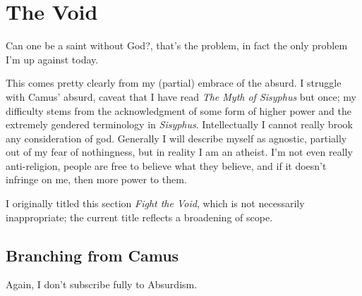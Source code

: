 \documentclass[../philo.tex]{subfiles}
\begin{document}
\chapter{The Void}  %
\epigraph{Can one be a saint without God?, that's the problem, in fact the only problem I'm up against today.}{}
\newpage
This comes pretty clearly from my (partial) embrace of the absurd.
I struggle with Camus' absurd, caveat that I have read \textit{The Myth of Sisyphus} but once; my difficulty stems from the acknowledgment of some form of higher power and the extremely gendered terminology in \textit{Sisyphus}.
Intellectually I cannot really brook any consideration of god.
Generally I will describe myself as agnostic, partially out of my fear of nothingness, but in reality I am an atheist.
I'm not even really anti-religion, people are free to believe what they believe, and if it doesn't infringe on me, then more power to them.

I originally titled this section \textit{Fight the Void}, which is not necessarily inappropriate; the current title reflects a broadening of scope.

\section{Branching from Camus}
Again, I don't subscribe fully to Absurdism.
\end{document}
